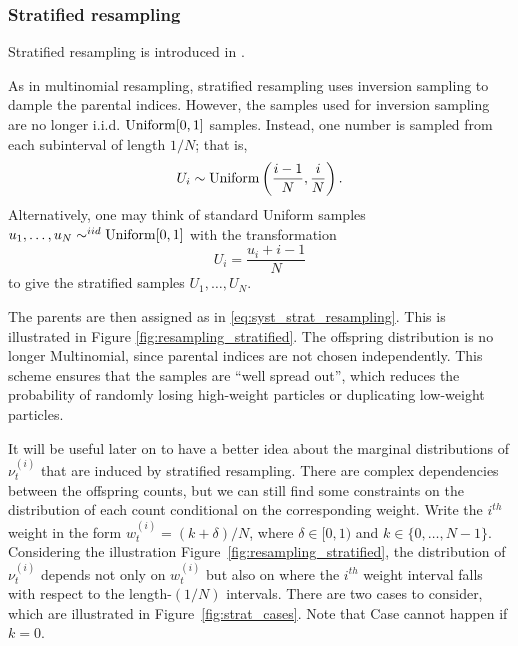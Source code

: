 \subsubsection{Stratified resampling \seb{$\checkmark$} }%
Stratified resampling is introduced in \cite{kitagawa1996}.

As in multinomial resampling, stratified resampling uses inversion sampling to dample the parental indices. However, the samples used for inversion sampling are no longer i.i.d. $\operatorname{Uniform}[0,1]$ samples. Instead, one number is sampled from each subinterval of length $1/N$; that is, 
\begin{equation*}
U_i \sim \operatorname{Uniform} \left(\frac{i-1}{N}, \frac{i}{N} \right) .
\end{equation*}
Alternatively, one may think of standard Uniform samples $u_1,\dots,u_N \sim^{iid} \operatorname{Uniform}[0,1]$ with the transformation
\begin{equation}
U_i = \frac{u_i + i -1}{N}
\end{equation}
to give the stratified samples $U_1,\dots,U_N$.

The parents are then assigned as in \eqref{eq:syst_strat_resampling}.
This is illustrated in Figure \ref{fig:resampling_stratified}.
The offspring distribution is no longer Multinomial, since parental indices are not chosen independently.
This scheme ensures that the samples are ``well spread out'', which reduces the probability of randomly losing high-weight particles or duplicating low-weight particles.

It will be useful later on to have a better idea about the marginal distributions of $\nu_t^{(i)}$ that are induced by stratified resampling. There are complex dependencies between the offspring counts, but we can still find some constraints on the distribution of each count conditional on the corresponding weight.
Write the $i^{th}$ weight in the form $w_t^{(i)} = (k + \delta)/N$, where $\delta \in [0,1)$ and $k\in \{0,\dots,N-1\}$.
Considering the illustration Figure~\ref{fig:resampling_stratified}, the distribution of $\nu_t^{(i)}$ depends not only on $w_t^{(i)}$ but also on where the $i^{th}$ weight interval falls with respect to the length-$(1/N)$ intervals. There are two cases to consider, which are illustrated in Figure~\ref{fig:strat_cases}. Note that Case  cannot happen if $k=0$.


